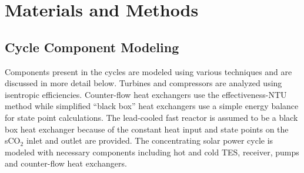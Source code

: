  
\section{Materials and Methods}







\subsection{Cycle Component Modeling}
Components present in the cycles are modeled using various techniques and are discussed in more detail below. Turbines and compressors are analyzed using isentropic efficiencies. Counter-flow heat exchangers use the effectiveness-NTU method while simplified ``black box'' heat exchangers use a simple energy balance for state point calculations. The lead-cooled fast reactor is assumed to be a black box heat exchanger because of the constant heat input and state points on the sCO$_2$ inlet and outlet are provided. The concentrating solar power cycle is modeled with necessary components including hot and cold TES, receiver, pumps and counter-flow heat exchangers.


